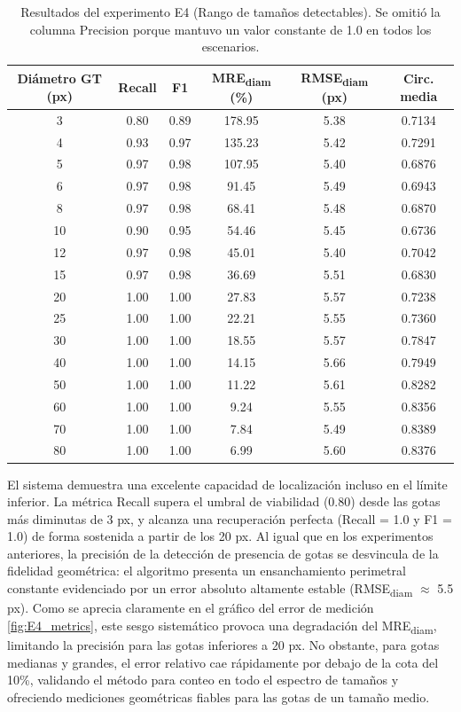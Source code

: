 \begin{table}[H]
\centering
\small
\caption{Resultados del experimento E4 (Rango de tamaños detectables). Se omitió la columna Precision porque mantuvo un valor constante de 1.0 en todos los escenarios.}
\begin{tabular}{cccccc}
\hline
\textbf{Diámetro GT (px)} & \textbf{Recall} & \textbf{F1} & \textbf{MRE\textsubscript{diam} (\%)} & \textbf{RMSE\textsubscript{diam} (px)} & \textbf{Circ. media} \\
\hline
3  & 0.80 & 0.89 & 178.95 & 5.38 & 0.7134 \\
4  & 0.93 & 0.97 & 135.23 & 5.42 & 0.7291 \\
5  & 0.97 & 0.98 & 107.95 & 5.40 & 0.6876 \\
6  & 0.97 & 0.98 & 91.45  & 5.49 & 0.6943 \\
8  & 0.97 & 0.98 & 68.41  & 5.48 & 0.6870 \\
10 & 0.90 & 0.95 & 54.46  & 5.45 & 0.6736 \\
12 & 0.97 & 0.98 & 45.01  & 5.40 & 0.7042 \\
15 & 0.97 & 0.98 & 36.69  & 5.51 & 0.6830 \\
20 & 1.00 & 1.00 & 27.83  & 5.57 & 0.7238 \\
25 & 1.00 & 1.00 & 22.21  & 5.55 & 0.7360 \\
30 & 1.00 & 1.00 & 18.55  & 5.57 & 0.7847 \\
40 & 1.00 & 1.00 & 14.15  & 5.66 & 0.7949 \\
50 & 1.00 & 1.00 & 11.22  & 5.61 & 0.8282 \\
60 & 1.00 & 1.00 & 9.24   & 5.55 & 0.8356 \\
70 & 1.00 & 1.00 & 7.84   & 5.49 & 0.8389 \\
80 & 1.00 & 1.00 & 6.99   & 5.60 & 0.8376 \\
\hline
\end{tabular}
\label{tab:e4_resultados}
\end{table}

El sistema demuestra una excelente capacidad de localización incluso en el límite inferior. La métrica Recall supera el umbral de viabilidad (0.80) desde las gotas más diminutas de 3 px, y alcanza una recuperación perfecta (Recall = 1.0 y F1 = 1.0) de forma sostenida a partir de los 20 px. Al igual que en los experimentos anteriores, la precisión de la detección de presencia de gotas se desvincula de la fidelidad geométrica: el algoritmo presenta un ensanchamiento perimetral constante evidenciado por un error absoluto altamente estable (RMSE\textsubscript{diam} $\approx$ 5.5 px). Como se aprecia claramente en el gráfico del error de medición \ref{fig:E4_metrics}, este sesgo sistemático provoca una degradación del MRE\textsubscript{diam}, limitando la precisión para las gotas inferiores a 20 px. No obstante, para gotas medianas y grandes, el error relativo cae rápidamente por debajo de la cota del 10\%, validando el método para conteo en todo el espectro de tamaños y ofreciendo mediciones geométricas fiables para las gotas de un tamaño medio.

